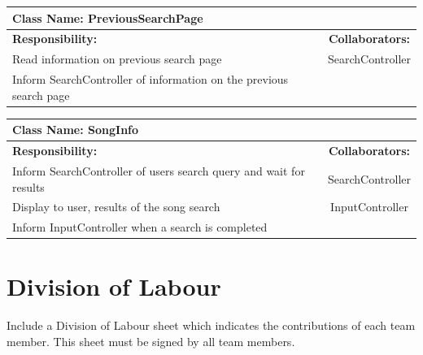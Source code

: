 \documentclass[]{article}
\begin{document}
	\begin{table}[a]
		\centering
		\begin{tabular}{| p{8cm} | c |} \hline
			\multicolumn{2}{|l|}{\textbf{Class Name: PreviousSearchPage}} \\ \hline
			\textbf{Responsibility:} & \textbf{Collaborators:} \\ \hline
			Read information on previous search page & SearchController \\ \hline
			Inform SearchController of information on the previous search page &   \\ \hline
		\end{tabular}
	\end{table}
	
	\begin{table}[a]
		\centering
		\begin{tabular}{| p{8cm} | c |} \hline
			\multicolumn{2}{|l|}{\textbf{Class Name: SongInfo}} \\ \hline
			\textbf{Responsibility:} & \textbf{Collaborators:} \\ \hline
			Inform SearchController of users search query and wait for results & SearchController \\ \hline
			Display to user, results of the song search & InputController \\ \hline
			Inform InputController when a search is completed &   \\ \hline
		\end{tabular}
	\end{table}


\appendix
\section{Division of Labour}
\label{sec:division_of_labour}
Include a Division of Labour sheet which indicates the contributions of each team member. This sheet must be signed by all team members.
\end{document}
